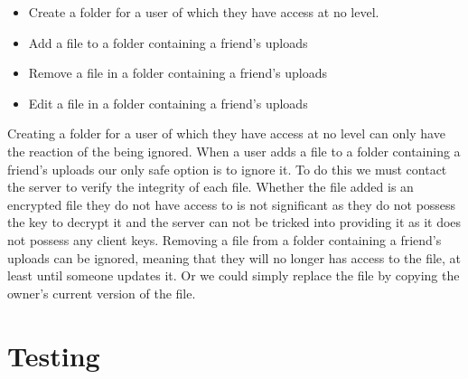 \documentclass[12pt, titlepage]{article}
\begin{document}
\begin{itemize}
	\item Create a folder for a user of which they have access at no level.
	\item Add a file to a folder containing a friend's uploads
	\item Remove a file in a folder containing a friend's uploads
	\item Edit a file in a folder containing a friend's uploads
\end{itemize}
Creating a folder for a user of which they have access at no level can only have the reaction of the being ignored.
\newline \indent When a user adds a file to a folder containing a friend's uploads our only safe option is to ignore it. To do this we must contact the server to verify the integrity of each file. Whether the file added is an encrypted file they do not have access to is not significant as they do not possess the key to decrypt it and the server can not be tricked into providing it as it does not possess any client keys.
\newline \indent Removing a file from a folder containing a friend's uploads can be ignored, meaning that they will no longer has access to the file, at least until someone updates it. Or we could simply replace the file by copying the owner's current version of the file.

\section{Testing}
\end{document}
